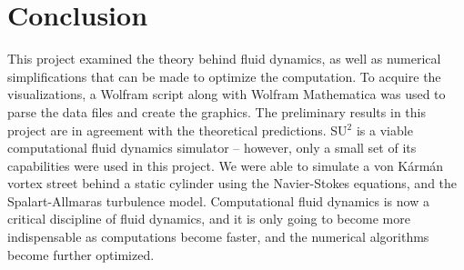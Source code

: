 \documentclass[10pt, titlepage]{article}
\begin{document}
\newpage

\section{Conclusion}

This project examined the theory behind fluid dynamics, as well as numerical simplifications that can be made to optimize the computation. To acquire the visualizations, a Wolfram script along with Wolfram Mathematica was used to parse the data files and create the graphics. The preliminary results in this project are in agreement with the theoretical predictions. SU$^2$ is a viable computational fluid dynamics simulator -- however, only a small set of its capabilities were used in this project. We were able to simulate a von K\'{a}rm\'{a}n vortex street behind a static cylinder using the Navier-Stokes equations, and the Spalart-Allmaras turbulence model. Computational fluid dynamics is now a critical discipline of fluid dynamics, and it is only going to become more indispensable as computations become faster, and the numerical algorithms become further optimized.

\newpage
\end{document}
